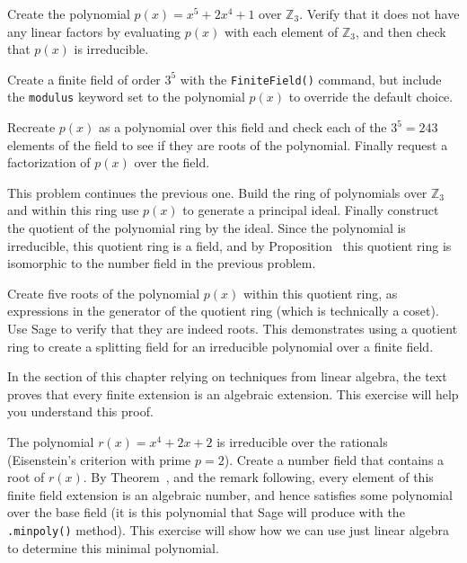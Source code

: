 \begin{sageverbatim}\end{sageverbatim}
%
%
Create the polynomial $p(x)=x^5+2x^4+1$ over ${\mathbb Z}_3$.  Verify that it does not have any linear factors by evaluating $p(x)$ with each element of ${\mathbb Z}_3$, and then check that $p(x)$ is irreducible.\par
%
Create a finite field of order $3^5$ with the \verb?FiniteField()? command, but include the \verb?modulus? keyword set to the polynomial $p(x)$ to override the default choice.\par
%
Recreate $p(x)$ as a polynomial over this field and check each of the $3^5 = 243$ elements of the field to see if they are roots of the polynomial.  Finally request a factorization of $p(x)$ over the field.
\begin{sageverbatim}\end{sageverbatim}
%
%
This problem continues the previous one.  Build the ring of polynomials over ${\mathbb Z}_3$ and within this ring use $p(x)$ to generate a principal ideal.  Finally construct the quotient of the polynomial ring by the ideal.  Since the polynomial is irreducible, this quotient ring is a field, and by Proposition~ this quotient ring is isomorphic to the number field in the previous problem.\par
%
Create five roots of the polynomial $p(x)$ within this quotient ring, as expressions in the generator of the quotient ring (which is technically a coset).  Use Sage to verify that they are indeed roots.  This demonstrates using a quotient ring to create a splitting field for an irreducible polynomial over a finite field.
\begin{sageverbatim}\end{sageverbatim}
%
%
In the section of this chapter relying on techniques from linear algebra, the text proves that every finite extension is an algebraic extension.  This exercise will help you understand this proof.\par
%
The polynomial $r(x)=x^4+2x+2$ is irreducible over the rationals (Eisenstein's criterion with prime $p=2$).  Create a number field that contains a root of $r(x)$.  By Theorem~, and the remark following, every element of this finite field extension is an algebraic number, and hence satisfies some polynomial over the base field (it is this polynomial that Sage will produce with the \verb?.minpoly()? method).  This exercise will show how we can use just linear algebra to determine this minimal polynomial.\par

